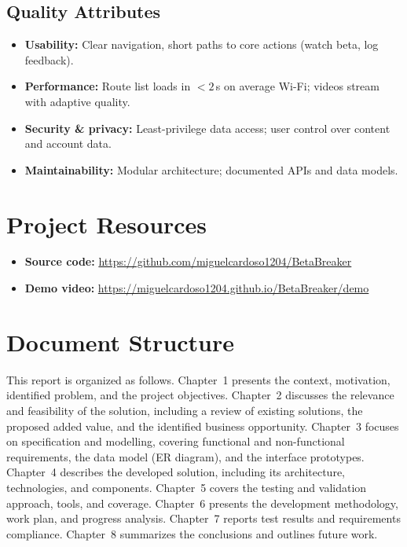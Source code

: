 \documentclass[12pt,a4paper]{report}
\renewcommand\_{\textunderscore\hspace{0pt}}
\begin{document}
\subsection{Quality Attributes}

\begin{itemize}[noitemsep]
    \item \textbf{Usability:} Clear navigation, short paths to core actions (watch beta, log feedback).
    \item \textbf{Performance:} Route list loads in $< 2$\,s on average Wi-Fi; videos stream with adaptive quality.
    \item \textbf{Security \& privacy:} Least-privilege data access; user control over content and account data.
    \item \textbf{Maintainability:} Modular architecture; documented APIs and data models.
\end{itemize}

\section{Project Resources}

\begin{itemize}[noitemsep]
    \item \textbf{Source code:} \url{https://github.com/miguelcardoso1204/BetaBreaker}
    \item \textbf{Demo video:} \url{https://miguelcardoso1204.github.io/BetaBreaker/demo}
\end{itemize}

\section{Document Structure}

This report is organized as follows. Chapter~1 presents the context, motivation, identified problem, and the project objectives. Chapter~2 discusses the relevance and feasibility of the solution, including a review of existing solutions, the proposed added value, and the identified business opportunity. Chapter~3 focuses on specification and modelling, covering functional and non-functional requirements, the data model (ER diagram), and the interface prototypes. Chapter~4 describes the developed solution, including its architecture, technologies, and components. Chapter~5 covers the testing and validation approach, tools, and coverage. Chapter~6 presents the development methodology, work plan, and progress analysis. Chapter~7 reports test results and requirements compliance. Chapter~8 summarizes the conclusions and outlines future work.
\end{document}
